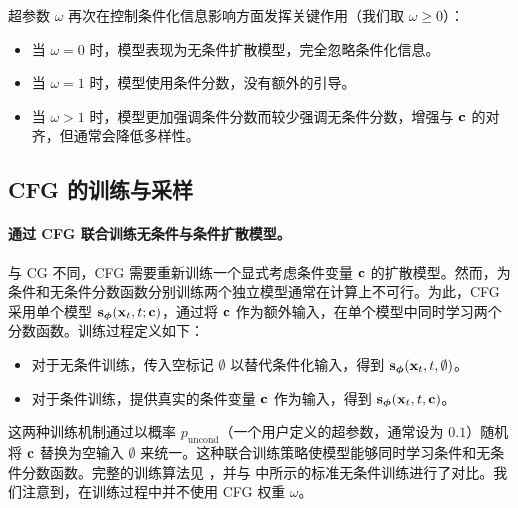超参数 $\omega$ 再次在控制条件化信息影响方面发挥关键作用（我们取 $\omega \ge 0$）：
\begin{itemize}
    \item 当 $\omega = 0$ 时，模型表现为无条件扩散模型，完全忽略条件化信息。
    \item 当 $\omega = 1$ 时，模型使用条件分数，没有额外的引导。
    \item 当 $\omega > 1$ 时，模型更加强调条件分数而较少强调无条件分数，增强与 ${\mathbf{c}}$ 的对齐，但通常会降低多样性。
\end{itemize}

\subsection{CFG 的训练与采样}


\paragraph{通过 CFG 联合训练无条件与条件扩散模型。} 与 CG 不同，CFG 需要重新训练一个显式考虑条件变量 ${\mathbf{c}}$ 的扩散模型。然而，为条件和无条件分数函数分别训练两个独立模型通常在计算上不可行。为此，CFG 采用单个模型 $\mathbf{s}_{\bm{\phi}}({\mathbf{x}}_t, t; {\mathbf{c}})$，通过将 ${\mathbf{c}}$ 作为额外输入，在单个模型中同时学习两个分数函数。训练过程定义如下：
\begin{itemize}
    \item 对于无条件训练，传入空标记 $\emptyset$ 以替代条件化输入，得到 ${\mathbf{s}}_{\bm{\phi}}({\mathbf{x}}_t, t, \emptyset)$。
    \item 对于条件训练，提供真实的条件变量 ${\mathbf{c}}$ 作为输入，得到 ${\mathbf{s}}_{\bm{\phi}}({\mathbf{x}}_t, t, {\mathbf{c}})$。
\end{itemize}
这两种训练机制通过以概率 $p_\mathrm{uncond}$（一个用户定义的超参数，通常设为 $0.1$）随机将 ${\mathbf{c}}$ 替换为空输入 $\emptyset$ 来统一。这种联合训练策略使模型能够同时学习条件和无条件分数函数。完整的训练算法见 ，并与  中所示的标准无条件训练进行了对比。我们注意到，在训练过程中并不使用 CFG 权重 $\omega$。

